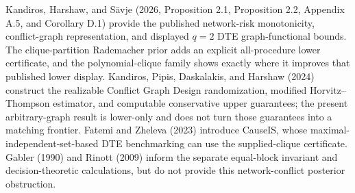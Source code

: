 Kandiros, Harshaw, and Sävje (2026, Proposition 2.1, Proposition 2.2, Appendix A.5, and Corollary D.1) provide the published network-risk monotonicity, conflict-graph representation, and displayed \(q=2\) DTE graph-functional bounds.  The clique-partition Rademacher prior adds an explicit all-procedure lower certificate, and the polynomial-clique family shows exactly where it improves that published lower display.  Kandiros, Pipis, Daskalakis, and Harshaw (2024) construct the realizable Conflict Graph Design randomization, modified Horvitz--Thompson estimator, and computable conservative upper guarantees; the present arbitrary-graph result is lower-only and does not turn those guarantees into a matching frontier.  Fatemi and Zheleva (2023) introduce CauseIS, whose maximal-independent-set-based DTE benchmarking can use the supplied-clique certificate.  Gabler (1990) and Rinott (2009) inform the separate equal-block invariant and decision-theoretic calculations, but do not provide this network-conflict posterior obstruction.